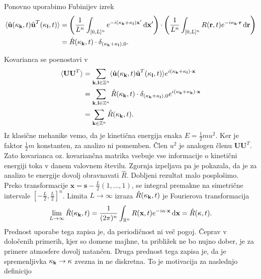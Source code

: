 \documentclass[mat2, tisk]{fmfdelo}
\newcommand{\R}{\mathbb R}
\newcommand{\Z}{\mathbb Z}
\newcommand{\bd}{\textbf}
\begin{document}
Ponovno uporabimo Fubinijev izrek 
\begin{align*}
  \langle \hat{\bd{u}}(\bd{\text{$\kappa$}}_\bd{k}, t) \hat{\bd{u}}^T(\bd{\text{$\kappa$}}_\bd{l}, t) \rangle &= \left(\frac{1}{L^{n}} \int_{[0, L]^{n}} e^{-i(\bd{\text{$\kappa$}}_{\bd{k}} + \bd{\text{$\kappa$}}_{\bd{l}})\bd{x}'} \dif\bd{x}' \right) \cdot\left(\frac{1}{L^n}\int_{[0, L]^{n}} R(\bd{r}, t) e^{-i\bd{\text{$\kappa$}}_{\bd{k}} \cdot \bd{r}} \dif\bd{r}\right) \\
&= \hat{R}(\text{\bd{$\kappa$}}_{\bd{k}}, t) \cdot \delta_{(\bd{\text{$\kappa$}}_{\bd{k}} + \bd{\text{$\kappa$}}_{\bd{l}}), 0}.
\end{align*}

Kovarianca se poenostavi v
\begin{align*}
\langle \bd{U} \bd{U}^T\rangle &= \sum_{\bd{k}, \bd{l}\in \Z^{n}} \langle \hat{\bd{u}}(\bd{\text{$\kappa$}}_\bd{k}, t) \hat{\bd{u}}^T(\bd{\text{$\kappa$}}_\bd{l}, t) \rangle e^{i(\bd{\text{$\kappa$}}_\bd{k} + \bd{\text{$\kappa$}}_\bd{l})\cdot \bd{x}} \\
&= \sum_{\bd{k}, \bd{l}\in \Z^{n}} \hat{R}(\text{\bd{$\kappa$}}_{\bd{k}}, t) \cdot \delta_{(\bd{\text{$\kappa$}}_{\bd{k}} + \bd{\text{$\kappa$}}_{\bd{l}}), 0} e^{i(\bd{\text{$\kappa$}}_\bd{k} + \bd{\text{$\kappa$}}_\bd{k})\cdot \bd{x}} \\
&= \sum_{\bd{k}\in \Z^{n}} \hat{R}(\text{\bd{$\kappa$}}_{\bd{k}}, t).
\end{align*}
Iz klasične mehanike vemo, da je kinetična energija enaka $E = \frac{1}{2} m u^2$. Ker je
faktor $\frac{1}{2} m$ konstanten, za analizo ni pomemben. Člen $u^2$ je analogen členu $\bd{U} \bd{U}^T$. 
Zato kovarianca oz. kovariančna matrika vsebuje vse informacije o kinetični energiji toka 
v danem valovnem številu.
Zgornja izpeljava pa je pokazala, da je za analizo te energije dovolj obravnavati 
$\hat{R}$. Dobljeni rezultat malo posplošimo. Preko transformacije $\bd{x} = \bd{s} - \frac{L}{2}(1, \dots, 1)$, 
se integral premakne na simetrične intervale 
$\left[-\frac{L}{2}, \frac{L}{2}\right]^n$. Limita $L \rightarrow \infty$ izraza $ \hat{R}(\bd{\text{$\kappa$}}_{\bd{k}}, t)$ je 
Fourierova transformacija
\begin{align*}
\lim_{L\rightarrow \infty} \hat{R}(\bd{\text{$\kappa$}}_{\bd{k}}, t) = \frac{1}{(2\pi)^n}\int_{\R^n} {R}(\bd{x}, t) e^{-i\text{\bd{$\kappa$}} \cdot \bd{x}} \dif \bd{x} = \hat{R}(\bd{\text{$\kappa$}}, t).
\end{align*}
Prednost uporabe tega zapisa je, da periodičnost ni več pogoj. Čeprav
v določenih primerih, kjer so domene majhne, ta približek ne bo nujno dober, 
je za primere atmosfere dovolj natančen. Druga prednost tega zapisa je, da je 
spremenljivka $\bd{\text{$\kappa$}}_{\bd{k}} \rightarrow \bd{\text{$\kappa$}}$
zvezna in ne diskretna. To je motivacija za naslednjo definicijo
\end{document}
